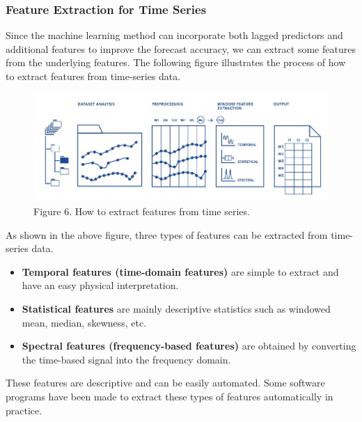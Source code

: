 \documentclass[
]{article}
\begin{document}
\hypertarget{feature-extraction-for-time-series}{%
\subsubsection{Feature Extraction for Time
Series}\label{feature-extraction-for-time-series}}

Since the machine learning method can incorporate both lagged predictors
and additional features to improve the forecast accuracy, we can extract
some features from the underlying features. The following figure
illustrates the process of how to extract features from time-series
data.

\begin{figure}

{\centering \includegraphics[width=11.9in]{img/w10-Serial-Feature-Extraction} 

}

\caption{Figure 6. How to extract features from time series.}\label{fig:unnamed-chunk-8}
\end{figure}

As shown in the above figure, three types of features can be extracted
from time-series data.

\begin{itemize}
\item
  \textbf{Temporal features (time-domain features)} are simple to
  extract and have an easy physical interpretation.
\item
  \textbf{Statistical features} are mainly descriptive statistics such
  as windowed mean, median, skewness, etc.
\item
  \textbf{Spectral features (frequency-based features)} are obtained by
  converting the time-based signal into the frequency domain.
\end{itemize}

These features are descriptive and can be easily automated. Some
software programs have been made to extract these types of features
automatically in practice.
\end{document}
